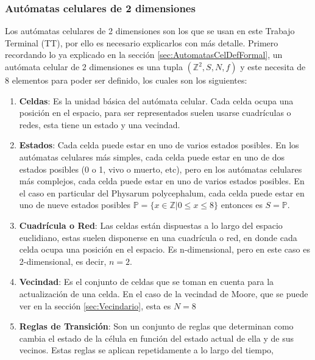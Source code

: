 \subsubsection{Aut\'omatas celulares de 2 dimensiones}
\label{sec:AutomatasCel2D}

    Los aut\'omatas celulares de 2 dimensiones son los que se usan en este Trabajo Terminal (TT), por ello es necesario
        explicarlos con m\'as detalle. Primero recordando lo ya explicado en la secci\'on \ref{sec:AutomatasCelDefFormal}, un aut\'omata
        celular de 2 dimensiones es una tupla $({\mathbb{Z}^{2}},S,N,f)$ y este 
        necesita de 8 elementos para poder ser definido, los cuales son los siguientes:         
    \begin{enumerate}
        \item \textbf{Celdas}: Es la unidad b\'asica del aut\'omata celular. Cada celda ocupa una posici\'on en el espacio, 
            para ser representados suelen usarse cuadr\'iculas o redes, esta tiene un estado y una vecindad.
        \item \textbf{Estados}: Cada celda puede estar en uno de varios estados posibles. En los aut\'omatas celulares
            m\'as simples, cada celda puede estar en uno de dos estados posibles (0 o 1, vivo o muerto, etc), pero en los 
            aut\'omatas celulares m\'as complejos, cada celda puede estar en uno de varios estados posibles. En el caso 
            en particular del Physarum polycephalum, cada celda puede estar en uno de nueve estados posibles 
            $\mathbb{P} = \{x \in \mathbb{Z}| 0 \leq x \leq 8\}$ entonces es $S = \mathbb{P}$.
        \item \textbf{Cuadr\'icula o Red}: Las celdas est\'an dispuestas a lo largo del espacio euclidiano, estas 
            suelen disponerse en una cuadr\'icula o red, en donde cada celda ocupa una posici\'on en el espacio. Es
            n-dimensional, pero en este caso es 2-dimensional, es decir, $n = 2$.
        \item \textbf{Vecindad}: Es el conjunto de celdas que se toman en cuenta para la actualizaci\'on de una celda. En el caso de
            la vecindad de Moore, que se puede ver en la secci\'on \ref{sec:Vecindario}, esta es $N = 8$
        \item \textbf{Reglas de Transici\'on}: Son un conjunto de reglas que determinan como cambia el estado de la c\'elula en 
            funci\'on del estado actual de ella y de sus vecinos. Estas reglas se aplican repetidamente a lo largo del tiempo,

\end{enumerate}
